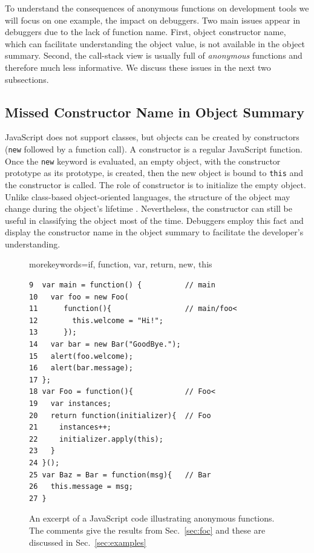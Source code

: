 \documentclass[10pt, preprint]{sigplanconf}
\begin{document}
To understand the consequences of anonymous functions on development tools we will focus on one example, the impact on debuggers.
Two main issues appear in debuggers due to the lack of function name. First, object constructor name, which can facilitate understanding the object value, is not available in the object summary. Second, the call-stack view is usually full of \textit{anonymous} functions and therefore much less informative. We discuss these issues in the next two subsections. 
 
\subsection{Missed Constructor Name in Object Summary}
\label{sec:missedctor}
JavaScript does not support classes, but objects can be created by constructors (\verb|new| followed by a function call). A constructor is a regular JavaScript function. Once the \verb|new| keyword is evaluated, an empty object, with the constructor prototype as its prototype, is created, then the new object is bound to \verb|this| and the constructor is called. The role of constructor is to initialize the empty object. Unlike class-based object-oriented languages, the structure of the object  may change during the object's lifetime \cite{Richards2}. Nevertheless, the constructor can still be useful in classifying the object most of the time.
Debuggers employ this fact and display the constructor name in the object summary to facilitate the developer's understanding. 

\begin{figure}%

\lstset{basicstyle=\scriptsize}
{morekeywords={if, function, var, return, new, this}}

\begin{lstlisting}[frame=single, language=myLang]
9  var main = function() {          // main
10   var foo = new Foo(            
11      function(){                 // main/foo<
12        this.welcome = "Hi!";
13      });
14   var bar = new Bar("GoodBye.");
15   alert(foo.welcome);
16   alert(bar.message);
17 };
18 var Foo = function(){            // Foo<    
19   var instances;
20   return function(initializer){  // Foo
21     instances++;         
22     initializer.apply(this);
23   }
24 }();
25 var Baz = Bar = function(msg){   // Bar
26   this.message = msg;
27 }
\end{lstlisting}
\caption{An excerpt of a JavaScript code illustrating anonymous functions. The comments give the results from Sec.~\ref{sec:foc} and these are discussed in Sec.~\ref{sec:examples}}
\label{js-code}
\end{figure}
\end{document}
